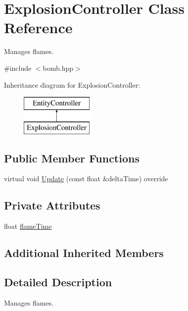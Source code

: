 \hypertarget{class_explosion_controller}{}\section{Explosion\+Controller Class Reference}
\label{class_explosion_controller}


Manages flames.  




{\ttfamily \#include $<$bomb.\+hpp$>$}

Inheritance diagram for Explosion\+Controller\+:\begin{figure}[H]
\begin{center}
\leavevmode
\includegraphics[height=2.000000cm]{class_explosion_controller}
\end{center}
\end{figure}
\subsection*{Public Member Functions}
\begin{DoxyCompactItemize}
\item 
virtual void \mbox{\hyperlink{class_explosion_controller_ad67c33a4c9fc0f23c84266cb382500f1}{Update}} (const float \&delta\+Time) override
\end{DoxyCompactItemize}
\subsection*{Private Attributes}
\begin{DoxyCompactItemize}
\item 
float \mbox{\hyperlink{class_explosion_controller_ac29b93a5277e3f486a02af139690fcbf}{flame\+Time}}
\end{DoxyCompactItemize}
\subsection*{Additional Inherited Members}


\subsection{Detailed Description}
Manages flames. 

